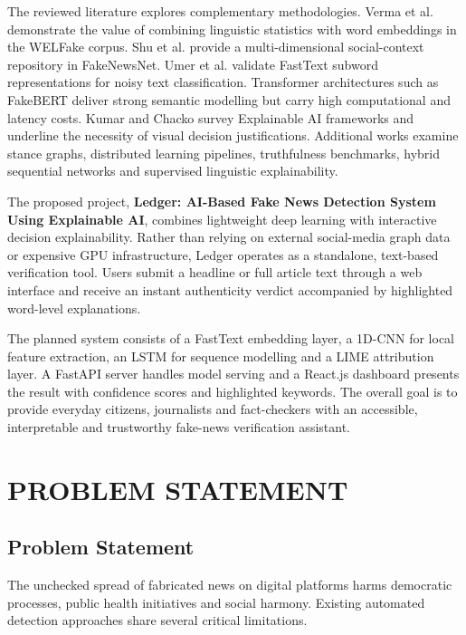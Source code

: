 \documentclass[12pt,a4paper,oneside]{report}
\begin{document}
The reviewed literature explores complementary methodologies. Verma et al. demonstrate
the value of combining linguistic statistics with word embeddings in the WELFake corpus.
Shu et al. provide a multi-dimensional social-context repository in FakeNewsNet. Umer et
al. validate FastText subword representations for noisy text classification. Transformer
architectures such as FakeBERT deliver strong semantic modelling but carry high
computational and latency costs. Kumar and Chacko survey Explainable AI frameworks and
underline the necessity of visual decision justifications. Additional works examine stance
graphs, distributed learning pipelines, truthfulness benchmarks, hybrid sequential
networks and supervised linguistic explainability.

The proposed project, \textbf{Ledger: AI-Based Fake News Detection System Using
Explainable AI}, combines lightweight deep learning with interactive decision
explainability. Rather than relying on external social-media graph data or expensive GPU
infrastructure, Ledger operates as a standalone, text-based verification tool. Users
submit a headline or full article text through a web interface and receive an instant
authenticity verdict accompanied by highlighted word-level explanations.

The planned system consists of a FastText embedding layer, a 1D-CNN for local feature
extraction, an LSTM for sequence modelling and a LIME attribution layer. A FastAPI
server handles model serving and a React.js dashboard presents the result with confidence
scores and highlighted keywords. The overall goal is to provide everyday citizens,
journalists and fact-checkers with an accessible, interpretable and trustworthy fake-news
verification assistant.

\chapter{PROBLEM STATEMENT}

\section{Problem Statement}

The unchecked spread of fabricated news on digital platforms harms democratic processes,
public health initiatives and social harmony. Existing automated detection approaches
share several critical limitations.
\end{document}

